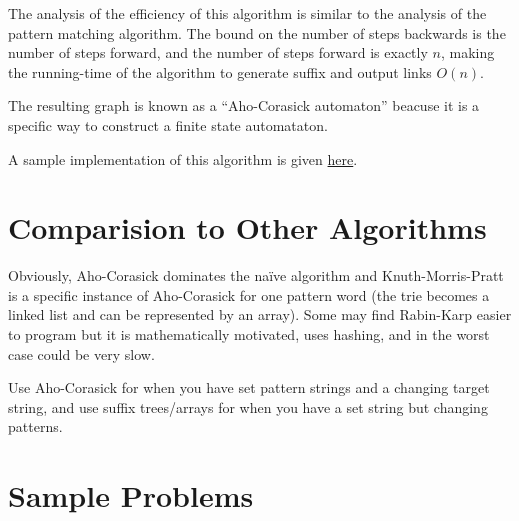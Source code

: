 \documentclass[11pt, oneside]{article}
\begin{document}
The analysis of the efficiency of this algorithm is similar to the analysis of the pattern matching algorithm.
The bound on the number of steps backwards is the number of steps forward, and the number of steps forward is
exactly \( n \), making the running-time of the algorithm to generate suffix and output links \( O(n) \).

The resulting graph is known as a ``Aho-Corasick automaton'' beacuse it is a specific way to construct
a finite state automataton.

A sample implementation of this algorithm is given \href{https://gist.github.com/stephen-huan/aa609965c86d750736398c28b025f9be#matching}{here}.

\section{Comparision to Other Algorithms}

Obviously, Aho-Corasick dominates the naïve algorithm and Knuth-Morris-Pratt is a specific instance of
Aho-Corasick for one pattern word (the trie becomes a linked list and can be represented by an array).
Some may find Rabin-Karp easier to program but it is mathematically motivated, uses hashing,
and in the worst case could be very slow.

Use Aho-Corasick for when you have set pattern strings and a changing target string,
and use suffix trees/arrays for when you have a set string but changing patterns.

\newpage

\section{Sample Problems}
\end{document}

